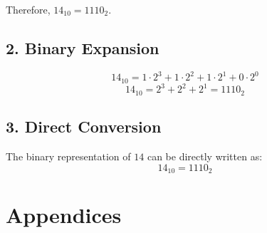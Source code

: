 \documentclass[10pt,a4paper]{article}
\begin{document}
\noindent Therefore, \(14_{10} = 1110_2\).

\subsection*{2. Binary Expansion}
\[
14_{10} = 1 \cdot 2^3 + 1 \cdot 2^2 + 1 \cdot 2^1 + 0 \cdot 2^0
\]
\[
14_{10} = 2^3 + 2^2 + 2^1 = 1110_2
\]

\subsection*{3. Direct Conversion}
The binary representation of \(14\) can be directly written as:
\[
14_{10} = 1110_2
\]


\appendix
{}
\section*{Appendices}

\newpage

\end{document}
